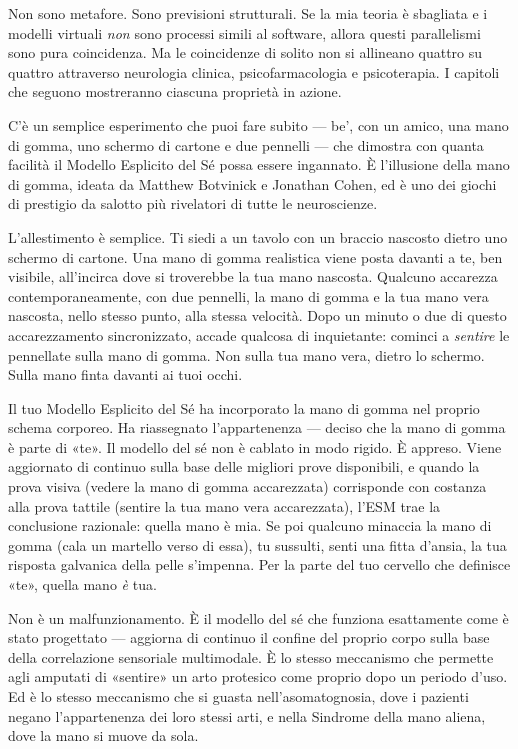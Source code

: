 \documentclass[11pt, twoside, openright]{book}
\begin{document}
Non sono metafore. Sono previsioni strutturali. Se la mia teoria è sbagliata e i modelli virtuali \textit{non} sono processi simili al software, allora questi parallelismi sono pura coincidenza. Ma le coincidenze di solito non si allineano quattro su quattro attraverso neurologia clinica, psicofarmacologia e psicoterapia. I capitoli che seguono mostreranno ciascuna proprietà in azione.

C'è un semplice esperimento che puoi fare subito --- be', con un amico, una mano di gomma, uno schermo di cartone e due pennelli --- che dimostra con quanta facilità il Modello Esplicito del Sé possa essere ingannato. È l'illusione della mano di gomma, ideata da Matthew Botvinick e Jonathan Cohen, ed è uno dei giochi di prestigio da salotto più rivelatori di tutte le neuroscienze.

L'allestimento è semplice. Ti siedi a un tavolo con un braccio nascosto dietro uno schermo di cartone. Una mano di gomma realistica viene posta davanti a te, ben visibile, all'incirca dove si troverebbe la tua mano nascosta. Qualcuno accarezza contemporaneamente, con due pennelli, la mano di gomma e la tua mano vera nascosta, nello stesso punto, alla stessa velocità. Dopo un minuto o due di questo accarezzamento sincronizzato, accade qualcosa di inquietante: cominci a \textit{sentire} le pennellate sulla mano di gomma. Non sulla tua mano vera, dietro lo schermo. Sulla mano finta davanti ai tuoi occhi.

Il tuo Modello Esplicito del Sé ha incorporato la mano di gomma nel proprio schema corporeo. Ha riassegnato l'appartenenza --- deciso che la mano di gomma è parte di «te». Il modello del sé non è cablato in modo rigido. È appreso. Viene aggiornato di continuo sulla base delle migliori prove disponibili, e quando la prova visiva (vedere la mano di gomma accarezzata) corrisponde con costanza alla prova tattile (sentire la tua mano vera accarezzata), l'ESM trae la conclusione razionale: quella mano è mia. Se poi qualcuno minaccia la mano di gomma (cala un martello verso di essa), tu sussulti, senti una fitta d'ansia, la tua risposta galvanica della pelle s'impenna. Per la parte del tuo cervello che definisce «te», quella mano \textit{è} tua.

Non è un malfunzionamento. È il modello del sé che funziona esattamente come è stato progettato --- aggiorna di continuo il confine del proprio corpo sulla base della correlazione sensoriale multimodale. È lo stesso meccanismo che permette agli amputati di «sentire» un arto protesico come proprio dopo un periodo d'uso. Ed è lo stesso meccanismo che si guasta nell'asomatognosia, dove i pazienti negano l'appartenenza dei loro stessi arti, e nella Sindrome della mano aliena, dove la mano si muove da sola.
\end{document}
